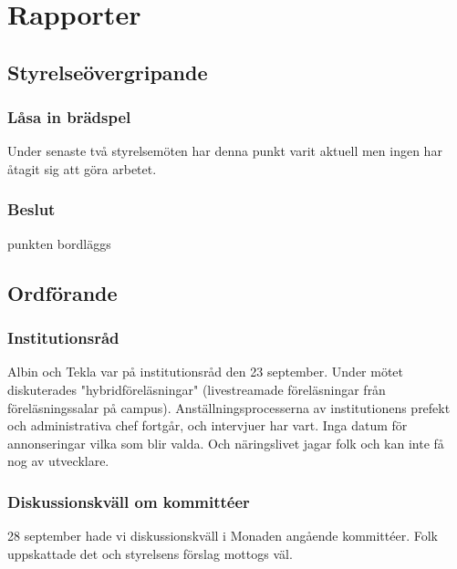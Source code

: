 \documentclass[protokoll]{dvd}
\begin{document}
\section{Rapporter}

\subsection{Styrelseövergripande}

\subsubsection{Låsa in brädspel}

Under senaste två styrelsemöten har denna punkt varit aktuell men ingen har åtagit sig att göra arbetet. 

\subsubsection*{Beslut}
\begin{attsatser}
    \item punkten bordläggs
\end{attsatser}









\newpage

\subsection{Ordförande}

\subsubsection{Institutionsråd}
Albin och Tekla var på institutionsråd den 23 september. Under mötet diskuterades "hybridföreläsningar" (livestreamade föreläsningar från föreläsningssalar på campus). Anställningsprocesserna av institutionens prefekt och administrativa chef fortgår, och intervjuer har vart. Inga datum för annonseringar vilka som blir valda. Och näringslivet jagar folk och kan inte få nog av utvecklare.

\subsubsection{Diskussionskväll om kommittéer}
28 september hade vi diskussionskväll i Monaden angående kommittéer. Folk uppskattade det och styrelsens förslag mottogs väl.
\end{document}
